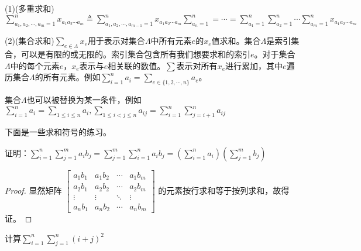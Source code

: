         \begin{definition}[多重求和及集合求和]
            (1)(多重求和)$\sum\limits_{a_1,a_2,\cdots,a_m=1}^{n}x_{a_{1}a_{2}\cdots a_{m}}\triangleq \sum\limits_{a_1,a_2,\cdots,a_{m-1}=1}^{n}x_{a_{1}a_{2}\cdots a_{m}}\sum\limits_{a_n=1}^n=\cdots=\sum\limits_{a_1=1}^n\sum\limits_{a_2=1}^n\cdots\sum\limits_{a_m=1}^{n}x_{a_{1}a_{2}\cdots a_{m}}$

            (2)(集合求和)$\sum\limits_{e\in\Lambda}x_e$用于表示对集合$\Lambda$中所有元素$e$的$x_e$值求和。集合$\Lambda$是索引集合，可以是有限的或无限的。索引集合包含所有我们想要求和的索引$e$。对于集合$\Lambda$中的每个元素$e$，$x_e$表示与$e$相关联的数值。$\sum$表示对所有$x_e$进行累加，其中$e$遍历集合$\Lambda$的所有元素。例如$\sum\limits_{i=1}^{n}a_i=\sum\limits_{e\in \{1,2,\cdots,n\}}a_e$。

            集合$\Lambda$也可以被替换为某一条件，例如$\sum\limits_{i=1}^{n}a_i=\sum\limits_{1\leq i\leq n}a_i,\sum\limits_{1\leq i<j\leq n}a_{ij}=\sum\limits_{i=1}^n\sum\limits_{j=i+1}^{n}a_{ij}$
        \end{definition}

        下面是一些求和符号的练习。

        \begin{example}
            证明：$\sum\limits_{i=1}^n\sum\limits_{j=1}^{m}a_{i}{b_j}=\sum\limits_{j=1}^{m}\sum\limits_{i=1}^{n}a_{i}{b_j}=\left(\sum\limits_{i=1}^{n}a_{i}\right) \left(\sum\limits_{j=1}^{m}b_{j}\right)$
        \end{example}

        \begin{proof}
            显然矩阵
            $\begin{bmatrix}
                a_{1}b_{1} & a_{1}b_{2} & \cdots & a_{1}b_{m} \\
                a_{2}b_{1} & a_{2}b_{2} & \cdots & a_{2}b_{m} \\
                \vdots & \vdots & \ddots & \vdots \\
                a_{n}b_{1} & a_{n}b_{2} & \cdots & a_{n}b_{m}
            \end{bmatrix}$
           的元素按行求和等于按列求和，故得证。
        \end{proof}

        \begin{example}
            计算$\sum\limits_{i=1}^n\sum\limits_{j=1}^n(i+j)^{2}$
        \end{example}

